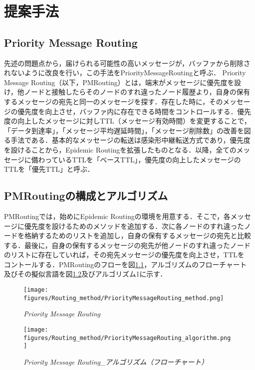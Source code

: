 \documentclass[11pt]{icsthesis}
\begin{document}
\chapter{提案手法}
\section{Priority Message Routing}
先述の問題点から，届けられる可能性の高いメッセージが，バッファから削除されないように改良を行い，この手法をPriorityMessageRoutingと呼ぶ．
Priority Message Routing（以下，PMRouting）とは，端末がメッセージに優先度を設け，他ノードと接触したらそのノードのすれ違ったノード履歴より，自身の保有するメッセージの宛先と同一のメッセージを探す．存在した時に，そのメッセージの優先度を向上させ，バッファ内に存在できる時間をコントロールする．優先度の向上したメッセージに対しTTL（メッセージ有効時間）を変更することで，「データ到達率」，「メッセージ平均遅延時間」，「メッセージ削除数」の改善を図る手法である．基本的なメッセージの転送は感染形中継転送方式であり，優先度を設けることから，Epidemic Routingを拡張したものとなる．以降，全てのメッセージに備わっているTTLを「ベースTTL」，優先度の向上したメッセージのTTLを「優先TTL」と呼ぶ．

\section{PMRoutingの構成とアルゴリズム}
PMRoutingでは，始めにEpidemic Routingの環境を用意する．そこで，各メッセージに優先度を設けるためのメソッドを追加する．次に各ノードのすれ違ったノードを格納するためのリストを追加し，自身の保有するメッセージの宛先と比較する．最後に，自身の保有するメッセージの宛先が他ノードのすれ違ったノードのリストに存在していれば，その宛先メッセージの優先度を向上させ，TTLをコントールする．PMRoutingのフローを図\ref{PriorityMessageRouting}，アルゴリズムのフローチャート及びその擬似言語を図\ref{PriorityMessageRoutingalgo}及びアルゴリズム1に示す．

\begin{figure}[h]
	\centering
	\texttt{[image: figures/Routing\_method/PriorityMessageRouting\_method.png]}
	\caption[]{\it{Priority Message Routing}}
	\label{PriorityMessageRouting}
\end{figure}

\begin{figure}[h]
	\centering
	\texttt{[image: figures/Routing\_method/PriorityMessageRouting\_algorithm.png]}
	\caption[]{\it{Priority Message Routing\_アルゴリズム（フローチャート）}}
	\label{PriorityMessageRoutingalgo}
\end{figure}
\end{document}
